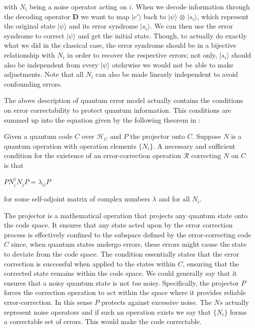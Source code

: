 \documentclass{Configuration_Files/PoliMi3i_thesis}
\begin{document}
with $N_i$ being a noise operator acting on $i$.
When we decode information through the decoding operator $\textbf{D}$ we want to map $|c' \rangle$ back to $|\psi \rangle$ $\otimes$ $|s_i \rangle$, which represent the original state $|\psi \rangle$ and its error syndrome $|s_i \rangle$. We can then use the error syndrome to correct $|\psi \rangle$ and get the initial state. Though, to actually do exactly what we did in the classical case, the error syndrome should be in a bijective relationship with $N_i$ in order to recover the respective errors; not only, $|s_i \rangle$ should also be independent from every $|\psi \rangle$ otehrwise we would not be able to make adjustments. Note that all $N_i$ can also be made linearly independent to avoid confounding errors. 

The above description of quantum error model actually contains the conditions on error correctability to protect quantum information. 
This conditions are summed up into the equation given by the following theorem in \cite{Nie06}: 

\begin{theorem}
	 Given a quantum code $C$ over $\mathscr{H}_C$ and $P$ the projector onto $C$. Suppose $N$ is a quantum operation with operation elements $\{N_i\}$. A necessary and sufficient condition for the existence of an error-correction operation $\mathcal{R}$ correcting $N$ on $C$ is that
	
	\begin{center}
		$PN_i^{\dagger}N_jP = \lambda_{ij}P$
	\end{center}
	
	for some self-adjoint matrix of complex numbers $\lambda$ and for all $N_i$. 
\end{theorem}

The projector is a mathematical operation that projects any quantum state onto the code space. It ensures that any state acted upon by the error correction process is effectively confined to the subspace defined by the error-correcting code $C$ since, when quantum states undergo errors, these errors might cause the state to deviate from the code space. \newline
The condition essentially states that the error correction is successful when applied to the states within $C$, ensuring that the corrected state remains within the code space. \newline
We could generally say that it ensures that a noisy quantum state is not {\it too} noisy. Specifically, the projector $P$ forces the correction operation to act within the space where it provides reliable error-correction. In this sense $P$ protects against excessive noise. The $Ns$ actually represent noise operators and if such an operation exists we say that $\{N_i\}$ forms a correctable set of errors. This would make the code correctable. \newline
\end{document}
